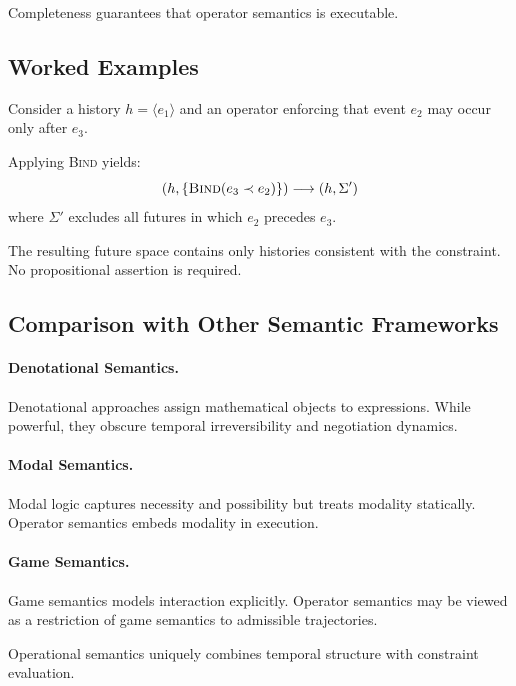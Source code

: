 \documentclass[11pt]{article}
\begin{document}
Completeness guarantees that operator semantics is executable.

\subsection{Worked Examples}

Consider a history $h = \langle e_1 \rangle$ and an operator enforcing that event
$e_2$ may occur only after $e_3$.

Applying \textsc{Bind} yields:
\[
(h, \{\textsc{Bind}(e_3 \prec e_2)\}) \longrightarrow (h, \Sigma')
\]
where $\Sigma'$ excludes all futures in which $e_2$ precedes $e_3$.

The resulting future space contains only histories consistent with the
constraint. No propositional assertion is required.

\subsection{Comparison with Other Semantic Frameworks}

\paragraph{Denotational Semantics.}
Denotational approaches assign mathematical objects to expressions. While
powerful, they obscure temporal irreversibility and negotiation dynamics.

\paragraph{Modal Semantics.}
Modal logic captures necessity and possibility but treats modality statically.
Operator semantics embeds modality in execution.

\paragraph{Game Semantics.}
Game semantics models interaction explicitly. Operator semantics may be viewed as
a restriction of game semantics to admissible trajectories.

Operational semantics uniquely combines temporal structure with constraint
evaluation.
\end{document}
